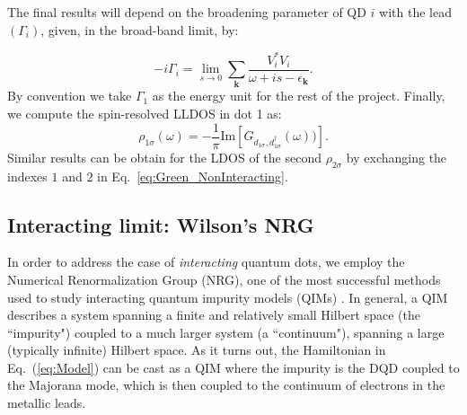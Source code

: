 \documentclass[showpacs,aps,prb,reprint,superscriptaddress]{revtex4-1}
\begin{document}
The final results will depend on the broadening parameter of QD $i$ with the lead $(\Gamma_i)$, given, in the broad-band limit, by:

\begin{equation}
   -i\Gamma_i = \lim_{s\rightarrow 0} \sum_{\boldsymbol{k}}\frac{V_{i}^{*}V_{i}}{\omega+ is -\epsilon_{\boldsymbol{k}}}.
\end{equation}
\noindent By convention we take $\Gamma_1$ as the energy unit for the rest of the project. Finally, we compute the spin-resolved LLDOS in dot 1 as:
%  
\begin{equation}
    \rho_{1\sigma}(\omega)=-\frac{1}{\pi} \textrm{Im} \left[G_{d_{1\sigma},d_{1\sigma}^\dagger}(\omega))\right].
    \label{eq:Density of States}
\end{equation}
\noindent Similar results can be obtain for the LDOS of the second $\rho_{2\sigma}$ by exchanging the indexes $1$ and $2$ in Eq.\ \eqref{eq:Green_NonInteracting}. 





\subsection{Interacting limit: Wilson's NRG }
\label{sec:NRG-interacting}


In order to address the case of \textit{interacting} quantum dots, we employ the Numerical Renormalization Group (NRG), one of the most successful methods used to study interacting quantum impurity models (QIMs)  \cite{wilson_renormalization_1975,sindel_numerical_2005,bulla_numerical_2008}. In general, a QIM describes a system spanning a finite and relatively small Hilbert space (the ``impurity") coupled to a much larger system (a ``continuum"), spanning a large (typically infinite) Hilbert space. As it turns out, the Hamiltonian in Eq.\ (\ref{eq:Model}) can be cast as a QIM where the impurity is the DQD coupled to the Majorana mode, which is then coupled to the continuum of electrons in the metallic leads.
\end{document}
